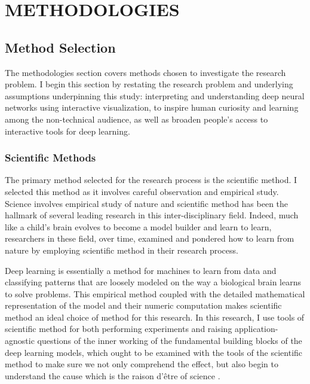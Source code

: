 \chapter{METHODOLOGIES}

\graphicspath{ {./methodologies/} }
\thispagestyle{empty}


\section{Method Selection}

The methodologies section covers methods chosen to investigate the research problem. I begin this section by restating the research problem and underlying assumptions underpinning this study: interpreting and understanding deep neural networks using interactive visualization, to inspire human curiosity and learning among the non-technical audience, as well as broaden people's access to interactive tools for deep learning.

\subsection{Scientific Methods}

The primary method selected for the research process is the scientific method. I selected this method as it involves careful observation and empirical study. Science involves empirical study of nature and scientific method has been the hallmark of several leading research in this inter-disciplinary field. Indeed, much like a child’s brain evolves to become a model builder and learn to learn, researchers in these field, over time, examined and pondered how to learn from nature by employing scientific method in their research process. 


Deep learning is essentially a method for machines to learn from data and classifying patterns that are loosely modeled on the way a biological brain learns to solve problems. This empirical method coupled with the detailed mathematical representation of the model and their numeric computation makes scientific method an ideal choice of method for this research. In this research, I use tools of scientific method for both performing experiments and raising application-agnostic questions of the inner working of the fundamental building blocks of the deep learning models, which ought to be examined with the tools of the scientific method to make sure we not only comprehend the effect, but also begin to understand the cause which is the raison d'\^{e}tre of science \cite{edsarx.1904.1092220190101}.

